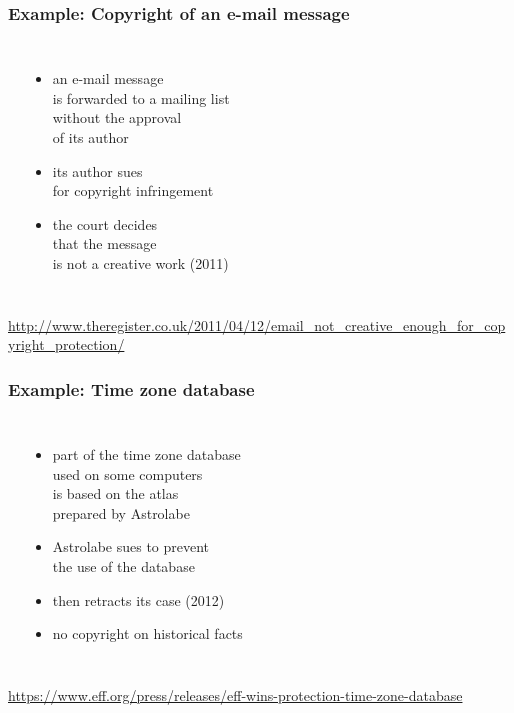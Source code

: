 \documentclass[dvipsnames]{beamer}
\theoremstyle{definition}
\theoremstyle{example}
\theoremstyle{plain}
\begin{document}
\begin{frame}
  \frametitle{Example: Copyright of an e-mail message}

  \begin{columns}
    \begin{center}
    \end{center}

    \begin{itemize}
      \item an e-mail message\\
        is forwarded to a mailing list\\
        without the approval\\
        of its author
      \item its author sues\\
        for copyright infringement
      \item the court decides\\
        that the message\\
        is not a creative work (2011)
    \end{itemize}
  \end{columns}

  \medskip
  \tiny{\url{http://www.theregister.co.uk/2011/04/12/email_not_creative_enough_for_copyright_protection/}}\\
\end{frame}

\begin{frame}
  \frametitle{Example: Time zone database}

  \begin{columns}
    \begin{center}
    \end{center}

    \begin{itemize}
      \item part of the time zone database\\
        used on some computers\\
        is based on the atlas\\
        prepared by Astrolabe
      \item Astrolabe sues to prevent\\
        the use of the database
      \item then retracts its case (2012)
      \item no copyright on historical facts
    \end{itemize}
  \end{columns}

  \medskip
  \tiny{\url{https://www.eff.org/press/releases/eff-wins-protection-time-zone-database}}\\
\end{frame}
\end{document}
